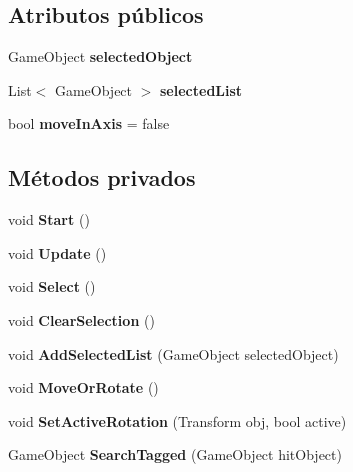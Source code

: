 \subsection*{Atributos públicos}
\begin{DoxyCompactItemize}
\item 
\mbox{\label{class_selection_control_ad7c2fe8ddd7a667218189d834d875437}} 
Game\+Object {\bfseries selected\+Object}
\item 
\mbox{\label{class_selection_control_a91300a4e40f06901799b7b582f53b398}} 
List$<$ Game\+Object $>$ {\bfseries selected\+List}
\item 
\mbox{\label{class_selection_control_a30385310a008d84dd95762f72dd31fed}} 
bool {\bfseries move\+In\+Axis} = false
\end{DoxyCompactItemize}
\subsection*{Métodos privados}
\begin{DoxyCompactItemize}
\item 
\mbox{\label{class_selection_control_a3561fe9fd9a6a8d2c6e4a2f389b6d2dd}} 
void {\bfseries Start} ()
\item 
\mbox{\label{class_selection_control_ad79a2cfc74608733edcd1be0164cc491}} 
void {\bfseries Update} ()
\item 
\mbox{\label{class_selection_control_a6e08e34b6c7bfe54260faeaa29b369c0}} 
void {\bfseries Select} ()
\item 
\mbox{\label{class_selection_control_a41c82620db4b415375d6579c5a0aa17b}} 
void {\bfseries Clear\+Selection} ()
\item 
\mbox{\label{class_selection_control_ae0e2d8a1673fab1de51bee6e15d3f872}} 
void {\bfseries Add\+Selected\+List} (Game\+Object selected\+Object)
\item 
\mbox{\label{class_selection_control_a9684b6a02a6e31a00c6a87b5e9d29f62}} 
void {\bfseries Move\+Or\+Rotate} ()
\item 
\mbox{\label{class_selection_control_a124591d0f0eac9b99cd9a7cc4f9839c7}} 
void {\bfseries Set\+Active\+Rotation} (Transform obj, bool active)
\item 
\mbox{\label{class_selection_control_af43fca6b87eee0f60bc8bb79f987d42c}} 
Game\+Object {\bfseries Search\+Tagged} (Game\+Object hit\+Object)
\end{DoxyCompactItemize}
